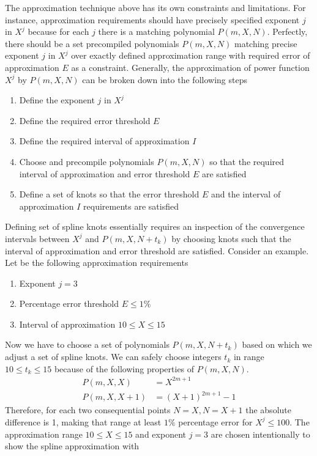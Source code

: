 The approximation technique above has its own constraints and limitations.
For instance, approximation requirements should have precisely specified exponent $j$ in $X^j$ because
for each $j$ there is a matching polynomial $P(m,X,N)$.
Perfectly, there should be a set precompiled polynomials $P(m,X,N)$ matching precise exponent $j$ in $X^j$ over
exactly defined approximation range with required error of approximation $E$ as a constraint.
Generally, the approximation of power function $X^j$ by $P(m,X,N)$ can be broken down into the following steps
\begin{enumerate}
    \item Define the exponent $j$ in $X^j$
    \item Define the required error threshold $E$
    \item Define the required interval of approximation $I$
    \item Choose and precompile polynomials $P(m,X,N)$
    so that the required interval of approximation and error threshold $E$ are satisfied
    \item Define a set of knots so that the error threshold $E$ and the interval of approximation $I$ requirements are satisfied
\end{enumerate}
Defining set of spline knots essentially requires an inspection of the
convergence intervals between $X^j$ and $P(m,X,N+t_k)$
by choosing knots such that the interval of approximation and error threshold are satisfied.
Consider an example.
Let be the following approximation requirements
\begin{enumerate}
    \item Exponent $j=3$
    \item Percentage error threshold $E\leq 1\%$
    \item Interval of approximation $10 \leq X \leq 15$
\end{enumerate}
Now we have to choose a set of polynomials $P(m, X, N+t_k)$ based on which we adjust a set of spline knots.
We can safely choose integers $t_k$ in range $10 \leq t_k \leq 15$ because
of the following properties of $P(m,X, N)$.
\begin{align*}
    P(m,X, X) &= X^{2m+1} \\
    P(m,X, X+1) &= (X+1)^{2m+1} - 1
\end{align*}
Therefore, for each two consequential points $N=X, N=X+1$ the absolute difference is 1, making that range
at least $1\%$ percentage error for $X^j \leq 100$.
The approximation range $10 \leq X \leq 15$ and exponent $j=3$ are chosen intentionally to show the spline approximation with
